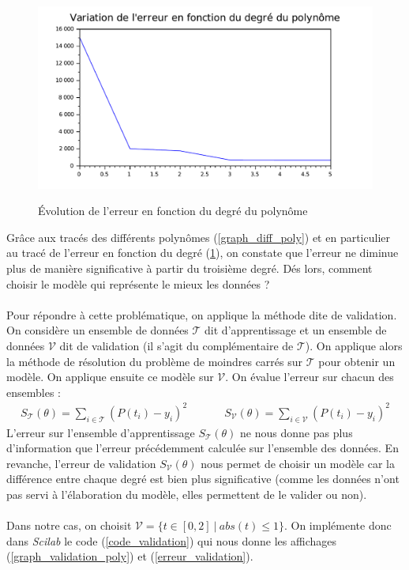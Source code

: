 \documentclass[a4paper,10pt]{report}
\begin{document}
\begin{figure}[H]
\centering
\caption{Évolution de l'erreur en fonction du degré du polynôme}
\includegraphics[width=12cm]{erreur_poly.pdf}
\label{erreur_poly}
\end{figure}

Grâce aux tracés des différents polynômes (\ref{graph_diff_poly}) et en particulier au tracé de l'erreur en fonction du degré (\ref{erreur_poly}), on constate que l'erreur ne diminue plus de manière significative à partir du troisième degré. Dés lors, comment choisir le modèle qui représente le mieux les données ?\\ \\
\indent Pour répondre à cette problématique, on applique la méthode dite de validation. On considère un ensemble de données $\mathcal{T}$ dit d'apprentissage et un ensemble de données $\mathcal{V}$ dit de validation (il s'agit du complémentaire de $\mathcal{T}$). On applique alors la méthode de résolution du problème de moindres carrés sur $\mathcal{T}$ pour obtenir un modèle. On applique ensuite ce modèle sur $\mathcal{V}$. On évalue l'erreur sur chacun des ensembles :\\
\begin{displaymath}
\begin{array}{ccc}
S_{\mathcal{T}}(\theta)=\sum \limits_{i \in \mathcal{T}}(P(t_i)-y_i)^2 & \ \ \ \ \ \ \ \ & S_{\mathcal{V}}(\theta)=\sum \limits_{i \in \mathcal{V}}(P(t_i)-y_i)^2
\end{array}
\end{displaymath}
L'erreur sur l'ensemble d'apprentissage $S_{\mathcal{T}}(\theta)$ ne nous donne pas plus d'information que l'erreur précédemment calculée sur l'ensemble des données. En revanche, l'erreur de validation $S_{\mathcal{V}}(\theta)$ nous permet de choisir un modèle car la différence entre chaque degré est bien plus significative (comme les données n'ont pas servi à l'élaboration du modèle, elles permettent de le valider ou non).\\ \\
\indent Dans notre cas, on choisit $\mathcal{V}=\{ t \in [0,2] \ | \ abs(t)\leq 1 \}$. On implémente donc dans \textit{Scilab} le code (\ref{code_validation}) qui nous donne les affichages (\ref{graph_validation_poly}) et (\ref{erreur_validation}).
\end{document}
